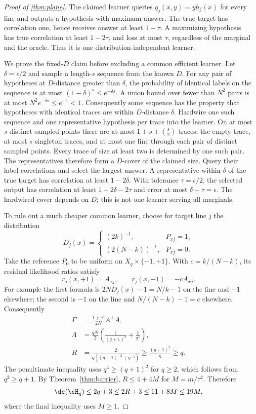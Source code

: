 \begin{proof}[Proof of \cref{thm:plane}]
The claimed learner queries $q_j(x,y)=y h_j(x)$ for every line and outputs a hypothesis with maximum answer. The true target has correlation one, hence receives answer at least $1-\tau$. A maximizing hypothesis has true correlation at least $1-2\tau$, and loss at most $\tau$, regardless of the marginal and the oracle. Thus it is one distribution-independent learner.

We prove the fixed-$D$ claim before excluding a common efficient learner. Let $\delta=\epsilon/2$ and sample a length-$s$ sequence from the known $D$. For any pair of hypotheses at $D$-distance greater than $\delta$, the probability of identical labels on the sequence is at most $(1-\delta)^s\leq e^{-\delta s}$. A union bound over fewer than $N^2$ pairs is at most $N^2e^{-\delta s}\leq e^{-1}<1$. Consequently some sequence has the property that hypotheses with identical traces are within $D$-distance $\delta$. Hardwire one such sequence and one representative hypothesis per trace into the learner. On at most $s$ distinct sampled points there are at most $1+s+\binom{s}{2}$ traces: the empty trace, at most $s$ singleton traces, and at most one line through each pair of distinct sampled points. Every trace of size at least two is determined by one such pair. The representatives therefore form a $D$-cover of the claimed size. Query their label correlations and select the largest answer. A representative within $\delta$ of the true target has correlation at least $1-2\delta$. With tolerance $\tau=\epsilon/2$, the selected output has correlation at least $1-2\delta-2\tau$ and error at most $\delta+\tau=\epsilon$. The hardwired cover depends on $D$; this is not one learner serving all marginals.

To rule out a much cheaper common learner, choose for target line $j$ the distribution
\[
 D_j(x)=\begin{cases}(2k)^{-1},&P_{xj}=1,\\[1mm]
 (2(N-k))^{-1},&P_{xj}=0.
 \end{cases}
\]
Take the reference $P_0$ to be uniform on $X_q\times\{-1,+1\}$. With $c=k/(N-k)$, its residual likelihood ratios satisfy
\[
 r_j(x,+1)=A_{xj},\qquad r_j(x,-1)=-cA_{xj}.
\]
For example the first formula is $2N D_j(x)-1=N/k-1$ on the line and $-1$ elsewhere; the second is $-1$ on the line and $N/(N-k)-1=c$ elsewhere. Consequently
\begin{align*}
 \Gamma&=\frac{1+c^2}{2N}A^\top A,\\
 \Lambda&=\frac{qN}{2}\left(\frac1{(q+1)^2}+\frac1{q^4}\right),\\
 R&=\frac{2}{q((q+1)^{-2}+q^{-4})}\geq\frac{(q+1)^2}{q}\geq q.
\end{align*}
The penultimate inequality uses $q^4\geq(q+1)^2$ for $q\geq2$, which follows from $q^2\geq q+1$. By Theorem~\ref{thm:barrier}, $R\leq4+4M$ for $M=m/\tau^2$. Therefore
\[
 \dc(\cH_q)\leq2q+3\leq2R+3\leq11+8M\leq19M,
\]
where the final inequality uses $M\geq1$.
\end{proof}

